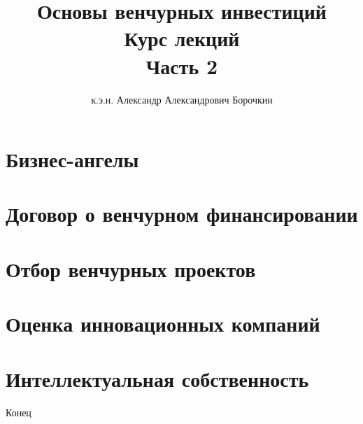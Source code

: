 \documentclass[12pt]{beamer}
\title[Основы венчурных инвестиций]{Основы венчурных инвестиций\\Курс лекций\\Часть 2}
\author{к.э.н. Александр Александрович Борочкин}
\institute{Нижегородский государственный университет}
\date{\the\year}
\begin{document}
\begin{frame}
\titlepage
\end{frame}

\section{Бизнес-ангелы}


\section{Договор о венчурном финансировании}


\section{Отбор венчурных проектов}


\section{Оценка инновационных компаний}


\section{Интеллектуальная собственность}


\begin{frame}
\begin{center}
\huge{Конец}
\end{center}
\end{frame}
\end{document}
